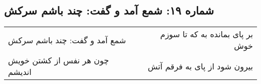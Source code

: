 \begin{center}
\section*{شماره ۱۹: شمع آمد و گفت: چند باشم سرکش}
\label{sec:019}
\begin{longtable}{l p{0.5cm} r}
شمع آمد و گفت: چند باشم سرکش
&&
بر پای بمانده به که تا سوزم خوش
\\
چون هر نفس از کشتن خویش اندیشم
&&
بیرون شود از پای به فرقم آتش
\\
\end{longtable}
\end{center}
